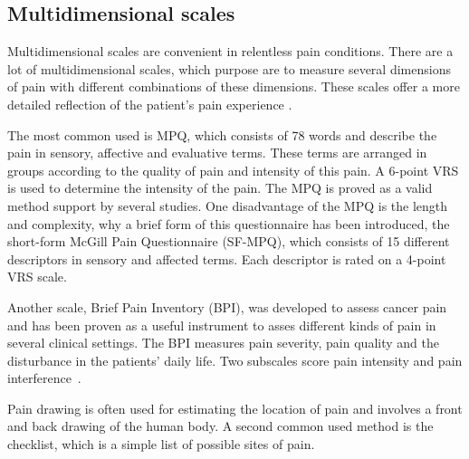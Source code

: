 \subsection{Multidimensional scales} 
Multidimensional scales are convenient in relentless pain conditions. There are a lot of multidimensional scales, which purpose are to measure several dimensions of pain with different combinations of these dimensions. These scales offer a more detailed reflection of the patient's pain experience \cite{Briggs2010}. 

The most common used is MPQ, which consists of 78 words and describe the pain in sensory, affective and evaluative terms. These terms are arranged in groups according to the quality of pain and intensity of this pain. A 6-point VRS is used to determine the intensity of the pain. The MPQ is proved as a valid method support by several studies. One disadvantage of the MPQ is the length and complexity, why a brief form of this questionnaire has been introduced, the short-form McGill Pain Questionnaire (SF-MPQ), which consists of 15 different descriptors in sensory and affected terms. Each descriptor is rated on a 4-point VRS scale.~\cite{Katz2001}

Another scale, Brief Pain Inventory (BPI), was developed to assess cancer pain and has been proven as a useful instrument to asses different kinds of pain in several clinical settings. The BPI measures pain severity, pain quality and the disturbance in the patients' daily life. Two subscales score pain intensity and pain interference~\cite{Katz2001}.  

Pain drawing is often used for estimating the location of pain and involves a front and back drawing of the human body. A second common used method is the checklist, which is a simple list of possible sites of pain.~\cite{Jensen2001} 



